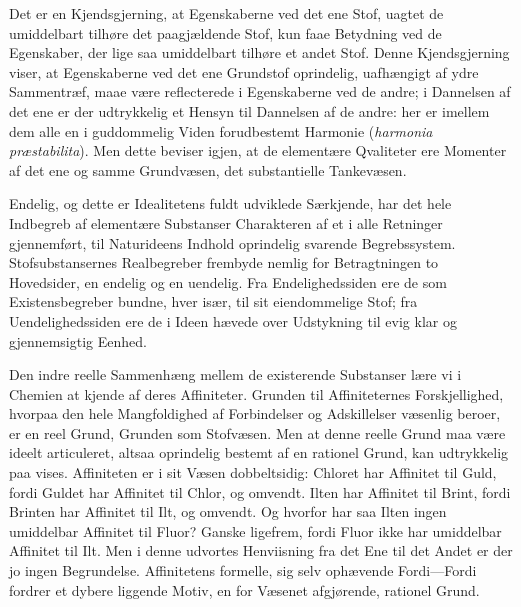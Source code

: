 \documentclass[12pt,a4paper]{book}
\begin{document}
Det er en Kjendsgjerning, at Egenskaberne ved det ene Stof, uagtet de
umiddelbart tilhøre det paagjældende Stof, kun faae Betydning ved de
Egenskaber, der lige saa umiddelbart tilhøre et andet Stof. Denne
Kjendsgjerning viser, at Egenskaberne ved det ene Grundstof oprindelig,
uafhængigt af ydre Sammentræf, maae være reflecterede i Egenskaberne ved
de andre; i Dannelsen af det ene er der udtrykkelig et Hensyn til
Dannelsen af de andre: her er imellem dem alle en i guddommelig Viden
forudbestemt Harmonie (\textit{harmonia præstabilita}). Men dette beviser
igjen, at de elementære Qvaliteter ere Momenter af det ene og samme
Grundvæsen, det substantielle Tankevæsen.

Endelig, og dette er Idealitetens fuldt udviklede Særkjende, har det hele
Indbegreb af elementære Substanser Charakteren af et i alle Retninger
gjennemført, til Naturideens Indhold oprindelig svarende Begrebssystem.
Stofsubstansernes Realbegreber frembyde nemlig for Betragtningen to
Hovedsider, en endelig og en uendelig. Fra Endelighedssiden ere de som
Existensbegreber bundne, hver især, til sit eiendommelige Stof; fra
Uendelighedssiden ere de i Ideen hævede over Udstykning til evig klar og
gjennemsigtig Eenhed.

Den indre reelle Sammenhæng mellem de existerende Substanser lære vi i
Chemien at kjende af deres Affiniteter. Grunden til Affiniteternes
Forskjellighed, hvorpaa den hele Mangfoldighed af Forbindelser og
Adskillelser væsenlig beroer, er en reel Grund, Grunden som Stofvæsen. Men
at denne reelle Grund maa være ideelt articuleret, altsaa oprindelig
bestemt af en rationel Grund, kan udtrykkelig paa\-%
vises. Affiniteten er i sit Væsen dobbeltsidig: Chloret har Affinitet til
Guld, fordi Guldet har Affinitet til Chlor, og omvendt. Ilten har
Affinitet til Brint, fordi Brinten har Affinitet til Ilt, og omvendt. Og
hvorfor har saa Ilten ingen umiddelbar Affinitet til Fluor? Ganske
ligefrem, fordi Fluor ikke har umiddelbar Affinitet til Ilt. Men i denne
udvortes Henviisning fra det Ene til det Andet er der jo ingen
Begrundelse. Affinitetens formelle, sig selv ophævende Fordi---Fordi
fordrer et dybere liggende Motiv, en for Væsenet afgjørende, rationel
Grund.
\end{document}

